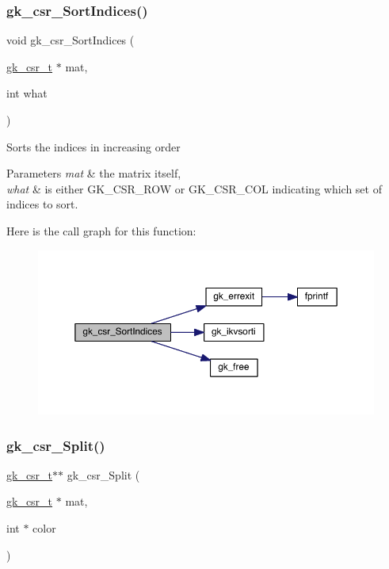 \subsubsection{\texorpdfstring{gk\+\_\+csr\+\_\+\+Sort\+Indices()}{gk\_csr\_SortIndices()}}
{\footnotesize\ttfamily void gk\+\_\+csr\+\_\+\+Sort\+Indices (\begin{DoxyParamCaption}\item[{\hyperlink{a00634}{gk\+\_\+csr\+\_\+t} $\ast$}]{mat,  }\item[{int}]{what }\end{DoxyParamCaption})}

Sorts the indices in increasing order 
\begin{DoxyParams}{Parameters}
{\em mat} & the matrix itself, \\
\hline
{\em what} & is either G\+K\+\_\+\+C\+S\+R\+\_\+\+R\+OW or G\+K\+\_\+\+C\+S\+R\+\_\+\+C\+OL indicating which set of indices to sort. \\
\hline
\end{DoxyParams}
Here is the call graph for this function\+:\nopagebreak
\begin{figure}[H]
\begin{center}
\leavevmode
\includegraphics[width=350pt]{a00023_a06ffa04d1369de42ae3b7d2a9f85b91d_cgraph}
\end{center}
\end{figure}
\mbox{\label{a00023_ac438fca404c3f1ff6989aa68f83ed241}} 
\subsubsection{\texorpdfstring{gk\+\_\+csr\+\_\+\+Split()}{gk\_csr\_Split()}}
{\footnotesize\ttfamily \hyperlink{a00634}{gk\+\_\+csr\+\_\+t}$\ast$$\ast$ gk\+\_\+csr\+\_\+\+Split (\begin{DoxyParamCaption}\item[{\hyperlink{a00634}{gk\+\_\+csr\+\_\+t} $\ast$}]{mat,  }\item[{int $\ast$}]{color }\end{DoxyParamCaption})}

